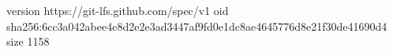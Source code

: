 version https://git-lfs.github.com/spec/v1
oid sha256:6cc3a042abee4c8d2e2e3ad3447af9fd0e1dc8ae4645776d8e21f30de41690d4
size 1158
